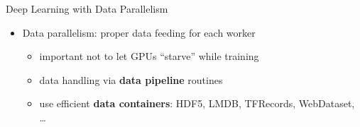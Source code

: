 \begin{frame}{Deep Learning with Data Parallelism}
\protect\hypertarget{deep-learning-with-data-parallelism-11}{}

\begin{itemize}
\tightlist
\item
  Data parallelism: proper data feeding for each worker

  \begin{itemize}
  \tightlist
  \item
    important not to let GPUs ``starve'' while training
  \item
    data handling via \textbf{data pipeline} routines
  \item
    use efficient \textbf{data containers}: HDF5, LMDB, TFRecords,
    WebDataset, \ldots{}
  \end{itemize}
\end{itemize}


\end{frame}

